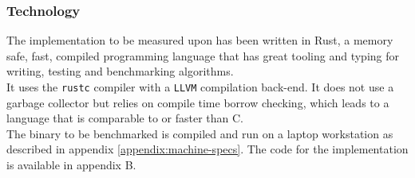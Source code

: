 \subsubsection{Technology}
The implementation to be measured upon has been written in Rust, a memory safe, fast, compiled programming language\cite{rust-lang} that has great tooling and typing for writing, testing and benchmarking algorithms.\\
It uses the \texttt{rustc} compiler with a \texttt{LLVM} compilation back-end. It does not use a garbage collector but relies on compile time borrow checking, which leads to a language that is comparable to or faster than C\cite{highleveldrivers}.\\
The binary to be benchmarked is compiled and run on a laptop workstation as described in appendix \ref{appendix:machine-specs}.
The code for the implementation is available in appendix B.

